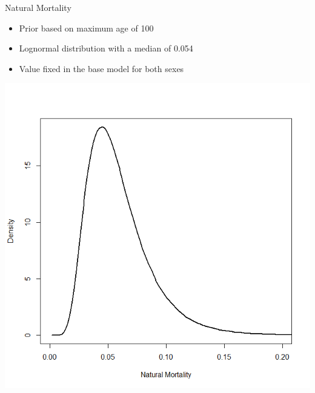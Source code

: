 \documentclass[pdf]{beamer}\usepackage[]{graphicx}\usepackage[]{color}
\begin{document}
\begin{frame}{Natural Mortality}
  \begin{itemize}
    \item Prior based on maximum age of 100
    \item Lognormal distribution with a median of 0.054
    \item Value fixed in the base model for both sexes
  \end{itemize}
  \begin{center}
    \includegraphics[scale = 0.23]{figures/m_prior.png}
  \end{center}
\end{frame}
\end{document}
